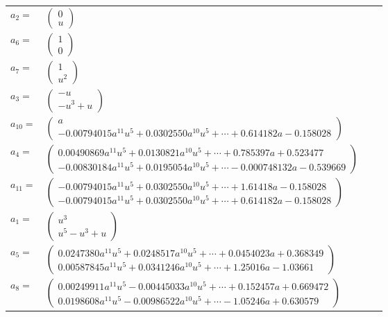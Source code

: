 \documentclass[1p]{elsarticle_modified}
\theoremstyle{definition}
\begin{document}
\begin{tabular}{m{7pt} m{180pt} m{7pt} m{180pt} }
\flushright $a_{2}=$&$\begin{pmatrix}0\\u\end{pmatrix}$ \\
\flushright $a_{6}=$&$\begin{pmatrix}1\\0\end{pmatrix}$ \\
\flushright $a_{7}=$&$\begin{pmatrix}1\\u^2\end{pmatrix}$ \\
\flushright $a_{3}=$&$\begin{pmatrix}- u\\- u^3+u\end{pmatrix}$ \\
\flushright $a_{10}=$&$\begin{pmatrix}a\\-0.00794015 a^{11} u^{5}+0.0302550 a^{10} u^{5}+\cdots+0.614182 a-0.158028\end{pmatrix}$ \\
\flushright $a_{4}=$&$\begin{pmatrix}0.00490869 a^{11} u^{5}+0.0130821 a^{10} u^{5}+\cdots+0.785397 a+0.523477\\-0.00830184 a^{11} u^{5}+0.0195054 a^{10} u^{5}+\cdots-0.000748132 a-0.539669\end{pmatrix}$ \\
\flushright $a_{11}=$&$\begin{pmatrix}-0.00794015 a^{11} u^{5}+0.0302550 a^{10} u^{5}+\cdots+1.61418 a-0.158028\\-0.00794015 a^{11} u^{5}+0.0302550 a^{10} u^{5}+\cdots+0.614182 a-0.158028\end{pmatrix}$ \\
\flushright $a_{1}=$&$\begin{pmatrix}u^3\\u^5- u^3+u\end{pmatrix}$ \\
\flushright $a_{5}=$&$\begin{pmatrix}0.0247380 a^{11} u^{5}+0.0248517 a^{10} u^{5}+\cdots+0.0454023 a+0.368349\\0.00587845 a^{11} u^{5}+0.0341246 a^{10} u^{5}+\cdots+1.25016 a-1.03661\end{pmatrix}$ \\
\flushright $a_{8}=$&$\begin{pmatrix}0.00249911 a^{11} u^{5}-0.00445033 a^{10} u^{5}+\cdots+0.152457 a+0.669472\\0.0198608 a^{11} u^{5}-0.00986522 a^{10} u^{5}+\cdots-1.05246 a+0.630579\end{pmatrix}$ \\

\end{tabular}
\end{document}
